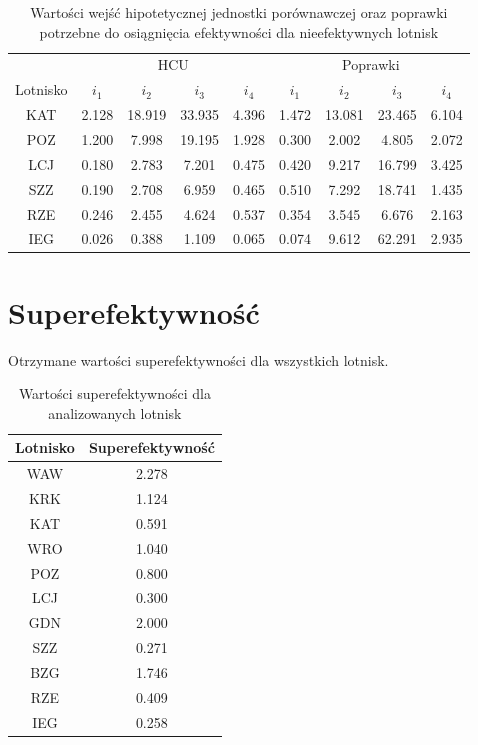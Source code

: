 \documentclass[a4paper,12pt]{article}
\begin{document}
\begin{table}[H]
    \centering
    \begin{tabular}{c|cccc|cccc}
    \hline
        & \multicolumn{4}{c|}{HCU} & \multicolumn{4}{c}{Poprawki}  \\
         Lotnisko & $i_1$ & $i_2$ & $i_3$ & $i_4$ & $i_1$ & $i_2$ & $i_3$ & $i_4$ \\ \hline
        KAT & 2.128 & 18.919 & 33.935 & 4.396 & 1.472 & 13.081 & 23.465 & 6.104 \\
        POZ & 1.200 & 7.998 & 19.195 & 1.928 & 0.300 & 2.002 & 4.805 & 2.072 \\
        LCJ & 0.180 & 2.783 & 7.201 & 0.475 & 0.420 & 9.217 & 16.799 & 3.425 \\
        SZZ & 0.190 & 2.708 & 6.959 & 0.465 & 0.510 & 7.292 & 18.741 & 1.435 \\
        RZE & 0.246 & 2.455 & 4.624 & 0.537 & 0.354 & 3.545 & 6.676 & 2.163 \\
        IEG & 0.026 & 0.388 & 1.109 & 0.065 & 0.074 & 9.612 & 62.291 & 2.935 \\
    \end{tabular}
    \caption{Wartości wejść hipotetycznej jednostki porównawczej oraz poprawki potrzebne do osiągnięcia efektywności dla nieefektywnych lotnisk }
    \label{tab:airports-hcu-and-improvements}
\end{table}

\section{Superefektywność}

Otrzymane wartości superefektywności dla wszystkich lotnisk.

\begin{table}[H]
    \centering
    \begin{tabular}{c|c}
    \hline
         Lotnisko & Superefektywność  \\ \hline
         WAW & 2.278 \\
         KRK & 1.124 \\
         KAT & 0.591 \\
         WRO & 1.040 \\
         POZ & 0.800 \\
         LCJ & 0.300 \\
         GDN & 2.000 \\
         SZZ & 0.271 \\
         BZG & 1.746 \\
         RZE & 0.409 \\
         IEG & 0.258 \\
    \end{tabular}
    \caption{Wartości superefektywności dla analizowanych lotnisk}
    \label{tab:airports-super-efficiency}
\end{table}
\end{document}
